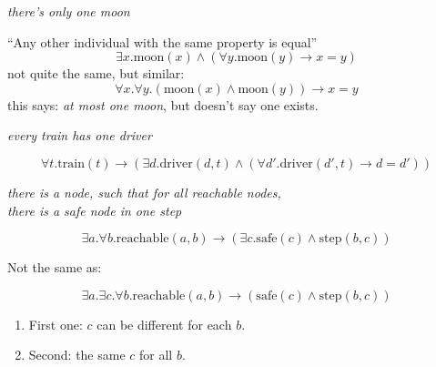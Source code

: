\documentclass[xetex,aspectratio=169,14pt,hyperref={pdfpagelabels=true,pdflang={en-GB}}]{beamer}
\begin{document}
\begin{frame}

  \begin{center}
    \emph{there's only one moon} \\
  \end{center}

  ``Any other individual with the same property is equal''
  \begin{displaymath}
    \exists x. \mathrm{moon}(x) \land (\forall y. \mathrm{moon}(y) \to x = y)
  \end{displaymath}
  not quite the same, but similar:
  \begin{displaymath}
    \forall x. \forall y. (\mathrm{moon}(x) \land \mathrm{moon}(y)) \to x = y
  \end{displaymath}
  this says: \emph{at most one moon}, but doesn't say one exists.

\end{frame}

\begin{frame}

  \begin{center}
    \emph{every train has one driver}
  \end{center}

  \begin{displaymath}
    \forall t. \mathrm{train}(t) \to (\exists d.\mathrm{driver}(d,t) \land (\forall d'. \mathrm{driver}(d',t) \to d = d'))
  \end{displaymath}

\end{frame}

\begin{frame}

  \begin{center}
    \emph{there is a node, such that for all reachable nodes, \\
      there is a safe node in one step}
  \end{center}

  \begin{displaymath}
    \exists a. \forall b. \mathrm{reachable}(a,b) \to (\exists c. \mathrm{safe}(c) \land \mathrm{step}(b,c))
  \end{displaymath}

  Not the same as:

  \begin{displaymath}
    \exists a. \exists c. \forall b. \mathrm{reachable}(a,b) \to (\mathrm{safe}(c) \land \mathrm{step}(b,c))
  \end{displaymath}

  \begin{enumerate}
  \item First one: $c$ can be different for each $b$.
  \item Second: the same $c$ for all $b$.
  \end{enumerate}

\end{frame}
\end{document}
